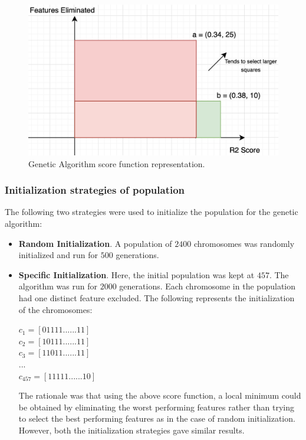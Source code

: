 \documentclass[11pt]{article}
\begin{document}
\begin{figure}[htb]
  \centering
    \includegraphics[scale=0.5]{images/scoreFuntionMultiObject}
    \caption{Genetic Algorithm score function representation.}
    \label{fig:scorefunctionfigure}
\end{figure}

\subsubsection{Initialization strategies of population}
The following two strategies were used to initialize the population for the genetic algorithm:
\begin{itemize}
\item \textbf{Random Initialization}.  A population of $2400$ chromosomes was randomly initialized and run for $500$ generations.
\item \textbf{Specific Initialization}.  Here, the initial population was kept at $457$.
The algorithm was run for $2000$ generations.
Each chromosome in the population had one distinct feature excluded.  The following represents the initialization of the chromosomes:

$
c_1 = [0 1 1 1 1 ......  1 1]
$ \\
$
c_2 = [1 0 1 1 1 ......  1 1]
$ \\
$
c_3 = [1 1 0 1 1 ......  1 1]
$ \\
$
... 
$ \\
$
c_{457} = [1 1 1 1 1 ......  1 0]
$

The rationale was that using the above score function, a local minimum could be obtained by eliminating the worst performing features rather than trying to select the best performing features as in the case of random initialization. However, both the initialization strategies gave similar results.
\end{itemize}
\end{document}
